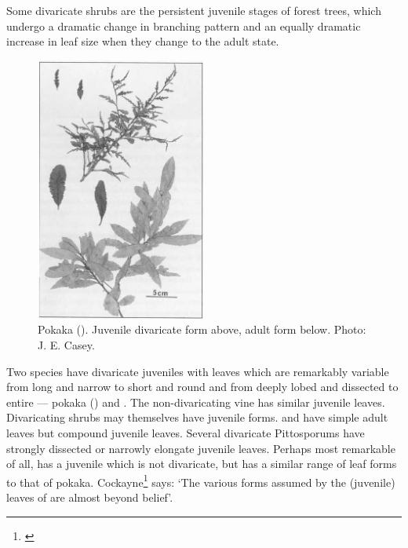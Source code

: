 Some divaricate shrubs are the persistent juvenile stages of forest trees, which undergo a dramatic change in branching pattern and an equally dramatic increase in leaf size when they change to the adult state.

\begin{figure}
	\includegraphics[width=0.5\textwidth]{graphics/figure78pokaka.jpg}
	\centering
	\caption[Pokaka]{Pokaka ().
	Juvenile divaricate form above, adult form below.
	Photo:  J. E. Casey.}%
	\label{fig:78pokaka}
\end{figure}

Two species have divaricate juveniles with leaves which are remarkably variable from long and narrow to short and round and from deeply lobed and dissected to entire --- pokaka () and .
The non-divaricating vine  has similar juvenile leaves.
Divaricating shrubs may themselves have juvenile forms.  and  have simple adult leaves but compound juvenile leaves.
Several divaricate Pittosporums have strongly dissected or narrowly elongate juvenile leaves.
Perhaps most remarkable of all,  has a juvenile which is not divaricate, but has a similar range of leaf forms to that of pokaka.
Cockayne\footnote{\cite{cockayne1899enquiry}} says: `The various forms assumed by the (juvenile) leaves of  are almost beyond belief'.

